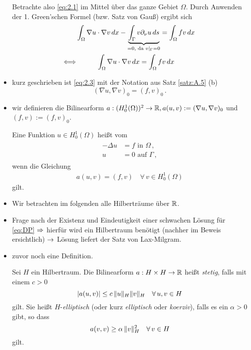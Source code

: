\begin{itemize}
Betrachte also \eqref{eq:2.1} im Mittel über das ganze Gebiet $\Omega$. Durch Anwenden der 1. Green'schen Formel (bzw. Satz von Gauß) ergibt sich
\begin{align}
\notag	& \int_\Omega \nabla u \cdot \nabla v \, dx -\underbrace{\int_\Gamma v \partial_\nu u \, ds}_{=0, \text{ da } v|_\Gamma = 0} = \int_\Omega f v \, dx \, \\
\label{eq:2.3}	\Longleftrightarrow & \quad \qquad \int_\Omega \nabla u \cdot \nabla v \, dx =\int_\Omega f v \, dx
\end{align}
\item kurz geschrieben ist \eqref{eq:2.3} mit der Notation aus Satz \ref{satz:A.5} (b) 
\[
	(\nabla u, \nabla v)_0 = (f,v)_0 \, .
\]
\item wir definieren die Bilinearform $a: (H^1_0(\Omega))^2 \rightarrow \mathbb{R}, a(u,v) := (\nabla u, \nabla v)_0$ und $(f,v):=(f,v)_0$.
\begin{defi}
Eine Funktion $u \in H^1_0(\Omega)$ heißt \textit{} vom 
\begin{align}\label{eq:DP}\tag{DP}
\begin{aligned}
	-\Delta  u &=  f \text{ in } \Omega \, ,\\
	 u & = 0 \text{ auf } \Gamma \, ,
\end{aligned}
\end{align}
wenn die Gleichung
\begin{align}\label{eq:2.4}
	a(u,v) = (f,v)\quad \forall \, v \in H^1_0(\Omega) 
\end{align}
gilt.
\end{defi}
\item Wir betrachten im folgenden alle Hilberträume über $\mathbb{R}$.
\item Frage nach der Existenz und Eindeutigkeit einer schwachen Lösung für \eqref{eq:DP} $\Rightarrow$ hierfür wird ein Hilbertraum benötigt (nachher im Beweis ersichtlich) $\rightarrow$ Lösung liefert der Satz von Lax-Milgram.
\item zuvor noch eine Definition.
\begin{defi}
Sei $H$ ein Hilbertraum. Die Bilinearform  $a : H\times H \rightarrow \mathbb{R}$ heißt \textit{stetig}, falls mit einem $c>0$
\[
	\lvert a(u,v)\rvert \le c \, \lVert u\rVert_H   \lVert v\rVert_H \quad \forall \, u,v \in H
\]
gilt. Sie heißt $H$-\textit{elliptisch} (oder kurz \textit{elliptisch} oder \textit{koerziv}), falls es ein $\alpha > 0$ gibt, so dass
\[
	a(v,v) \ge \alpha \, \lVert v\rVert_H^2 \quad \forall \, v \in H 
\]
gilt.
\end{defi}


\end{itemize}
